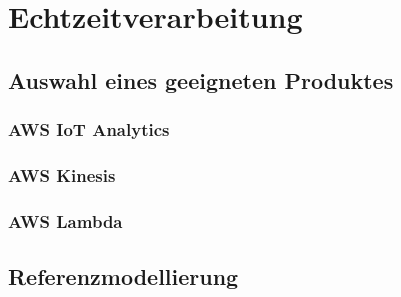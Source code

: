 \section{Echtzeitverarbeitung}

\subsection{Auswahl eines geeigneten Produktes}

\subsubsection{AWS IoT Analytics}

\subsubsection{AWS Kinesis}

\subsubsection{AWS Lambda}

\subsection{Referenzmodellierung}
